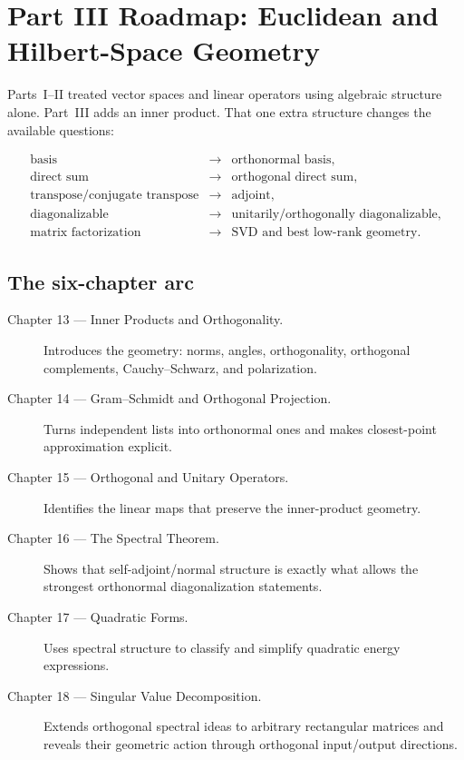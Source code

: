 \chapter*{Part III Roadmap: Euclidean and Hilbert-Space Geometry}
\label{sec:i-part3-roadmap}

Parts~I--II treated vector spaces and linear operators using algebraic
structure alone. Part~III adds an inner product. That one extra structure
changes the available questions:

\[
\begin{array}{ccl}
\text{basis} &\longrightarrow& \text{orthonormal basis},\\[0.2em]
\text{direct sum} &\longrightarrow& \text{orthogonal direct sum},\\[0.2em]
\text{transpose/conjugate transpose} &\longrightarrow& \text{adjoint},\\[0.2em]
\text{diagonalizable} &\longrightarrow& \text{unitarily/orthogonally diagonalizable},\\[0.2em]
\text{matrix factorization} &\longrightarrow& \text{SVD and best low-rank geometry}.
\end{array}
\]

\section*{The six-chapter arc}

\begin{description}
\item[Chapter 13 — Inner Products and Orthogonality.]
Introduces the geometry: norms, angles, orthogonality, orthogonal complements,
Cauchy--Schwarz, and polarization.

\item[Chapter 14 — Gram--Schmidt and Orthogonal Projection.]
Turns independent lists into orthonormal ones and makes closest-point
approximation explicit.

\item[Chapter 15 — Orthogonal and Unitary Operators.]
Identifies the linear maps that preserve the inner-product geometry.

\item[Chapter 16 — The Spectral Theorem.]
Shows that self-adjoint/normal structure is exactly what allows the strongest
orthonormal diagonalization statements.

\item[Chapter 17 — Quadratic Forms.]
Uses spectral structure to classify and simplify quadratic energy expressions.

\item[Chapter 18 — Singular Value Decomposition.]
Extends orthogonal spectral ideas to arbitrary rectangular matrices and reveals
their geometric action through orthogonal input/output directions.
\end{description}

